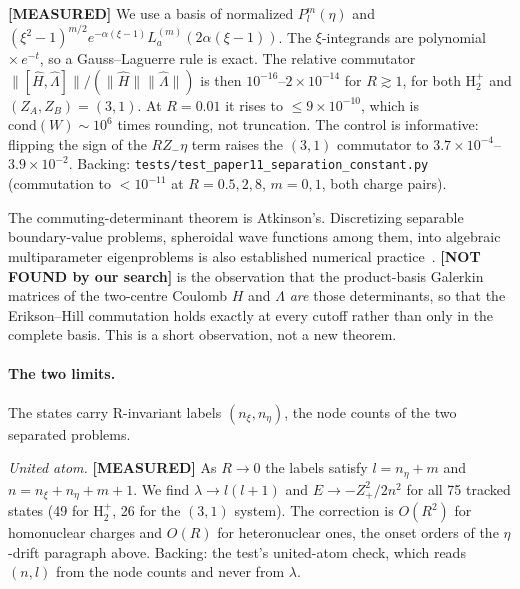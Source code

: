 \documentclass[aps,pra,twocolumn,superscriptaddress,longbibliography]{revtex4-2}
\begin{document}
\textbf{[MEASURED]} We use a basis of normalized $P_l^m(\eta)$ and
$(\xi^2-1)^{m/2}e^{-\alpha(\xi-1)}L_a^{(m)}(2\alpha(\xi-1))$. The
$\xi$-integrands are polynomial $\times\,e^{-t}$, so a Gauss--Laguerre
rule is exact. The relative commutator
$\|[\hat H,\hat\Lambda]\|/(\|\hat H\|\|\hat\Lambda\|)$ is then
$10^{-16}$--$2\times10^{-14}$ for $R \gtrsim 1$, for both H$_2^+$ and
$(Z_A,Z_B) = (3,1)$. At $R = 0.01$ it rises to $\le 9\times10^{-10}$,
which is $\mathrm{cond}(W)\sim10^6$ times rounding, not truncation. The
control is informative: flipping the sign of the $R Z_-\eta$ term raises
the $(3,1)$ commutator to $3.7\times10^{-4}$--$3.9\times10^{-2}$.
Backing: \texttt{tests/test\_paper11\_separation\_constant.py}
(commutation to $<10^{-11}$ at $R = 0.5, 2, 8$, $m = 0, 1$, both
charge pairs).

The commuting-determinant theorem is Atkinson's. Discretizing separable
boundary-value problems, spheroidal wave functions among them, into
algebraic multiparameter eigenproblems is also established numerical
practice~\cite{Plestenjak2015}. \textbf{[NOT FOUND by our search]} is
the observation that the product-basis Galerkin matrices of the
two-centre Coulomb $H$ and $\Lambda$ \emph{are} those determinants, so
that the Erikson--Hill commutation holds exactly at every cutoff rather
than only in the complete basis. This is a short observation, not a new
theorem.

\paragraph{The two limits.}
The states carry R-invariant labels $(n_\xi, n_\eta)$, the node counts
of the two separated problems.

\emph{United atom.} \textbf{[MEASURED]} As $R\to0$ the labels satisfy
$l = n_\eta + m$ and $n = n_\xi + n_\eta + m + 1$. We find
$\lambda \to l(l+1)$ and $E \to -Z_+^2/2n^2$ for all 75 tracked states
(49 for H$_2^+$, 26 for the $(3,1)$ system). The correction is $O(R^2)$
for homonuclear charges and $O(R)$ for heteronuclear ones, the onset
orders of the $\eta$-drift paragraph above. Backing: the test's
united-atom check, which reads $(n,l)$ from the node counts and never
from $\lambda$.
\end{document}
